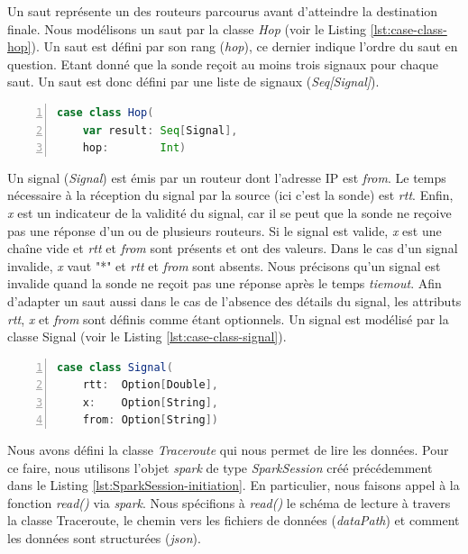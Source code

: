Un saut  représente un des routeurs parcourus avant d'atteindre la destination finale. Nous modélisons un saut  par la classe \textit{Hop} (voir le Listing \ref{lst:case-class-hop}). Un saut  est défini par son rang (\textit{hop}), ce dernier indique l'ordre du saut en question. Etant donné que la sonde reçoit au moins trois  signaux pour chaque saut. Un saut est donc défini par une liste de signaux (\textit{Seq[Signal]}).
\begin{lstlisting}[language=scala,firstnumber=1, caption={Définition de la  classe Hop},label={lst:case-class-hop}, basicstyle = \footnotesize,escapechar=|,numbers=left,
stepnumber=1]
case class Hop(
	var result: Seq[Signal],
	hop:        Int)
\end{lstlisting}

Un signal (\textit{Signal}) est émis par  un routeur  dont l'adresse IP est \textit{from}. Le temps nécessaire à la réception du signal par la source (ici c'est la sonde) est   \textit{rtt}. Enfin, \textit{x} est un indicateur de la validité du signal, car il se peut que la sonde ne reçoive pas une réponse d'un ou de plusieurs routeurs. Si le signal est valide, \textit{x} est une chaîne vide et \textit{rtt} et \textit{from} sont présents et ont des valeurs. Dans le cas d'un signal invalide, \textit{x} vaut "*" et \textit{rtt} et \textit{from} sont absents. Nous précisons qu'un signal est invalide quand la sonde ne reçoit pas une réponse après le temps \textit{tiemout}. Afin d'adapter un saut aussi dans le cas de l'absence des détails du signal, les attributs \textit{rtt}, \textit{x}  et \textit{from} sont définis comme étant optionnels.  
Un signal est modélisé par la classe Signal (voir le Listing \ref{lst:case-class-signal}). 

\begin{lstlisting}[language=scala,firstnumber=1, caption={Définition de la  classe Signal}, label={lst:case-class-signal}, basicstyle = \footnotesize,escapechar=|,numbers=left,
stepnumber=1]
case class Signal(
	rtt:  Option[Double],
	x:    Option[String],
	from: Option[String])
\end{lstlisting}

Nous avons défini  la classe \textit{Traceroute} qui nous permet de lire les données. Pour ce faire, nous utilisons l'objet \textit{spark} de type \textit{SparkSession} créé précédemment dans le Listing \ref{lst:SparkSession-initiation}. En particulier, nous faisons appel à   la fonction \textit{read()} via \textit{spark}. Nous spécifions à \textit{read()} le schéma de lecture à travers la classe Traceroute, le chemin vers les fichiers de données (\textit{dataPath}) et comment  les données  sont structurées (\textit{json}). 

